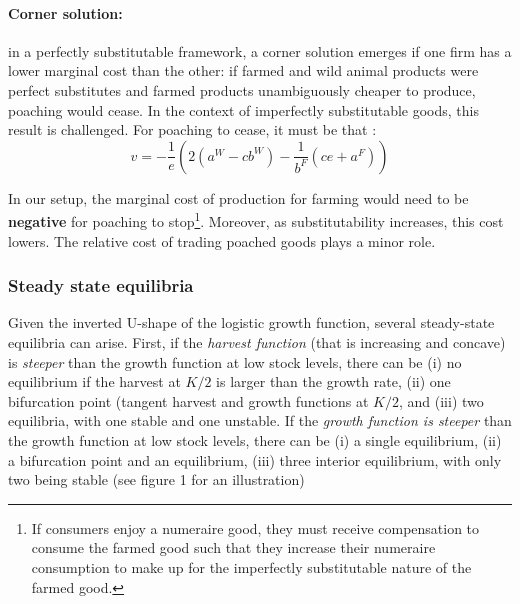 \paragraph{Corner solution:} in a perfectly substitutable framework, a corner solution emerges if one firm has a lower marginal cost than the other: if farmed and wild animal products were perfect substitutes and farmed products unambiguously cheaper to produce, poaching would cease. In the context of imperfectly substitutable goods, this result is challenged. For poaching to cease, it must be that : 
\begin{equation}
v = -\frac{1}{e}(2(a^W - cb^W) - \frac{1}{b^F}(ce + a^F))
\end{equation}

In our setup, the marginal cost of production for farming would need to be \textbf{negative} for poaching to stop\footnote{If consumers enjoy a numeraire good, they must receive compensation to consume the farmed good such that they increase their numeraire consumption to make up for the imperfectly substitutable nature of the farmed good. }. Moreover, as substitutability increases, this cost lowers. The relative cost of trading poached goods plays a minor role.  


\subsubsection{Steady state equilibria}
\label{section:steadystates}
Given the inverted U-shape of the logistic growth function, several steady-state equilibria can arise. 
First, if the \textit{harvest function} (that is increasing and concave) is \textit{steeper} than the growth function at low stock levels, there can be (i) no equilibrium if the harvest at $K/2$ is larger than the growth rate, (ii) one bifurcation point (tangent harvest and growth functions at $K/2$, and (iii) two equilibria, with one stable and one unstable. If the \textit{growth function is steeper} than the growth function at low stock levels, there can be (i) a single equilibrium, (ii) a bifurcation point and an equilibrium, (iii) three interior equilibrium, with only two being stable (see figure 1 for an illustration)




